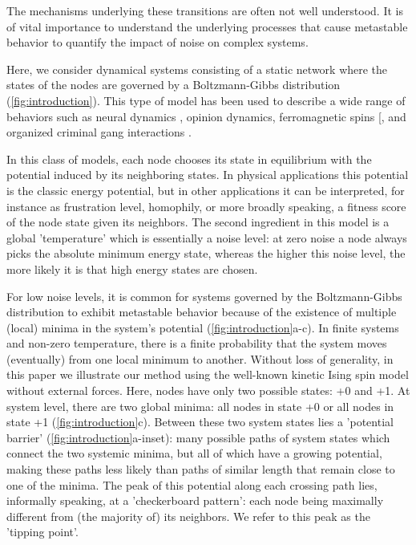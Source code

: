 \documentclass[a4paper, 11pt, twocolumn]{article}
\begin{document}
The mechanisms  underlying these  transitions are  often not
well understood. It is of vital importance to understand the
underlying  processes  that  cause  metastable  behavior  to
quantify the impact of noise on complex systems.

Here, we  consider dynamical systems consisting  of a static
network  where the  states of  the nodes  are governed  by a
Boltzmann-Gibbs distribution (\cref{fig:introduction}). This
type of  model has  been used  to describe  a wide  range of
behaviors  such   as  neural   dynamics  \cite{Hopfield1982b},
opinion dynamics, ferromagnetic spins [\cite{Glauber1963}, and
organized criminal gang interactions \cite{DOrsogna2015a}.

In  this class  of models,  each node  chooses its  state in
equilibrium with  the potential  induced by  its neighboring
states.  In  physical  applications this  potential  is  the
classic energy  potential, but in other  applications it can
be   interpreted,  for   instance   as  frustration   level,
homophily, or more broadly speaking,  a fitness score of the
node  state given  its neighbors.  The second  ingredient in
this model is a global  'temperature' which is essentially a
noise level: at zero noise  a node always picks the absolute
minimum energy  state, whereas the higher  this noise level,
the more likely it is that high energy states are chosen.

For low noise  levels, it is common for  systems governed by
the  Boltzmann-Gibbs  distribution   to  exhibit  metastable
behavior because of the existence of multiple (local) minima
in the system's potential (\cref{fig:introduction}{a-c}). In
finite systems  and non-zero temperature, there  is a finite
probability  that the  system  moves  (eventually) from  one
local  minimum to  another. Without  loss of  generality, in
this  paper we  illustrate our  method using  the well-known
kinetic  Ising spin  model  without  external forces.  Here,
nodes have  only two possible  states: +0 and +1.  At system
level, there are two global minima: all nodes in state +0 or
all nodes in  state +1 (\cref{fig:introduction}{c}). Between
these  two   system  states   lies  a   'potential  barrier'
(\cref{fig:introduction}{a-inset}):  many possible  paths of
system states which connect the two systemic minima, but all
of which have  a growing potential, making  these paths less
likely than paths of similar length that remain close to one
of  the  minima.  The  peak of  this  potential  along  each
crossing path lies, informally  speaking, at a 'checkerboard
pattern':  each node  being  maximally  different from  (the
majority of)  its neighbors.  We refer to  this peak  as the
'tipping point'.
\end{document}
